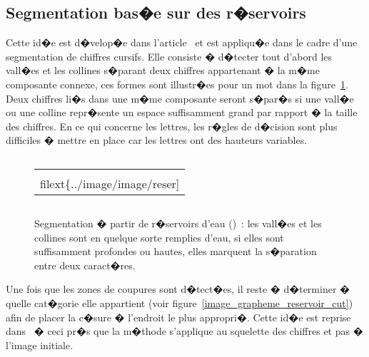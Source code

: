 \subsection{Segmentation bas�e sur des r�servoirs}
\label{image_segmentation_reservoir}


Cette id�e est d�velop�e dans l'article~ et est appliqu�e dans le cadre d'une segmentation de chiffres cursifs. Elle consiste � d�tecter tout d'abord les vall�es et les collines s�parant deux chiffres appartenant � la m�me composante connexe, ces formes sont illustr�es pour un mot dans la figure~\ref{image_grapheme_reservoir}. Deux chiffres li�s dans une m�me composante seront s�par�s si une vall�e ou une colline repr�sente un espace suffisamment grand par rapport � la taille des chiffres. En ce qui concerne les lettres, les r�gles de d�cision sont plus difficiles � mettre en place car les lettres ont des hauteurs variables.


            \begin{figure}[ht]
        $$\begin{tabular}{|c|}\hline
        \texttt{[image: \\filext\{../image/image/reser]}}
        \\ \hline \end{tabular}$$
        \caption{    Segmentation � partir de r�servoirs d'eau ()~: 
                            les vall�es et les collines sont en quelque sorte    remplies d'eau, si elles
                            sont suffisamment profondes ou hautes, elles marquent la s�paration entre deux
                            caract�res.}
        \label{image_grapheme_reservoir}
            \end{figure}

Une fois que les zones de coupures sont d�tect�es, il reste � d�terminer � quelle cat�gorie elle appartient (voir figure~\ref{image_grapheme_reservoir_cut}) afin de placer la c�sure � l'endroit le plus appropri�. Cette id�e est reprise dans~ � ceci pr�s que la m�thode s'applique au squelette des chiffres et pas � l'image initiale.




